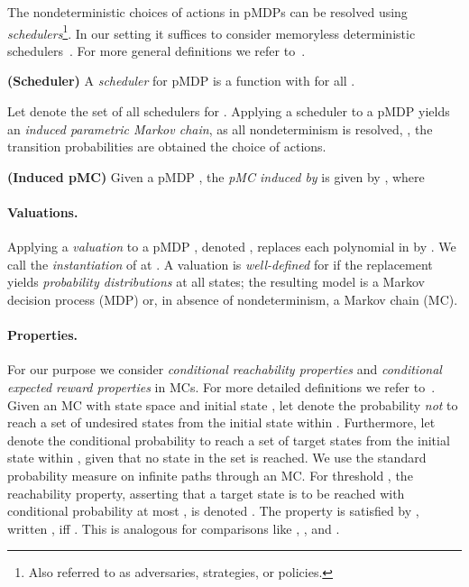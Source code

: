 The nondeterministic choices of actions in pMDPs can be resolved using \emph{schedulers}\footnote{Also referred to as adversaries, strategies, or policies.}.
In our setting it suffices to consider memoryless deterministic schedulers~\cite{Var85}. 
For more general definitions we refer to~\cite{BK08}.
\begin{definition}{\bf (Scheduler)}\label{def:scheduler}
	A \emph{scheduler} for pMDP  is a function  with  for all .  
\end{definition}
Let  denote the set of all schedulers for .
Applying a scheduler to a pMDP yields an \emph{induced parametric Markov chain}, as all nondeterminism is resolved, \ie, the transition probabilities are obtained \wrt the choice of actions.
\begin{definition}{\bf (Induced pMC)}\label{def:induced_dtmc} 
	Given a pMDP , the \emph{pMC induced by } is given by , where
	 
\end{definition}



\paragraph{Valuations.}

Applying a \emph{valuation}  to a pMDP , denoted , replaces each polynomial  in  by .
We call  the \emph{instantiation} of  at .
A valuation  is \emph{well-defined} for  if the replacement yields \emph{probability distributions} at all states; the resulting model  is a Markov decision process (MDP) or, in absence of nondeterminism, a Markov chain (MC).


\paragraph{Properties.}

For our purpose we consider \emph{conditional reachability properties} and \emph{conditional expected reward properties} in MCs.
For more detailed definitions we refer to~\cite[Ch.\ 10]{BK08}.
Given an MC  with state space  and initial state , let  denote the probability \emph{not} to reach a set of undesired states  from the initial state  within .
Furthermore, let  denote the conditional probability to reach a set of target states  from the initial state  within , given that no state in the set  is reached.
We use the standard probability measure on infinite paths through an MC.
For threshold , the reachability property, asserting that a target state is to be reached with conditional probability at most , is denoted .
The property is satisfied by , written , iff .
This is analogous for comparisons like , , and .

